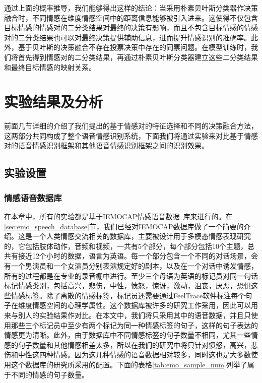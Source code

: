 通过上面的概率推导，我们能够得出这样的结论：当采用朴素贝叶斯分类器作决策融合时，不同情感在维度情感空间中的距离信息能够被引入进来。这使得不仅包含目标情感的情感对的二分类结果对最终的决策有影响，而且不包含目标情感的情感对的二分类结果也可以对最终决策提供辅助信息，进而提升情感识别的准确率。此外，基于贝叶斯的决策融合不存在投票决策中存在的同票问题。在模型训练时，我们将首先得到情感对的二分类结果，再通过朴素贝叶斯分类器建立这些二分类结果和最终目标情感的映射关系。

\section{实验结果及分析}
\label{sec:experiment}

前面几节详细的介绍了我们提出的基于情感对的特征选择和不同的决策融合方法，这两部分共同构成了整个语音情感识别系统，下面我们将通过实验来对比基于情感对的语音情感识别框架和其他语音情感识别框架之间的识别效果。

\subsection{实验设置}
\label{ssec:experiment_setup}

\subsubsection{情感语音数据库}
\label{sssec:speech_database}

在本章中，所有的实验都是基于IEMOCAP情感语音数据~\cite{Busso2008IEMOCAP}库来进行的。在\ref{sec:emo_speech_database}节，我们已经对IEMOCAP数据库做了一个简要的介绍。这是一个人类情感交流相关的数据库，主要被设计用于多模态情感表现研究的，它包括肢体动作，音频和视频，一共有5个部分，每个部分包括10个主题，总共有接近12个小时的数据，语言为英语。每一个部分包含一个不同的对话场景，会有一个男演员和一个女演员分别表演规定好的剧本，以及在一个对话中诱发情感，所有的过程都是在专业的录音棚中进行。至少三个母语为英语的标记员对同一句话标记情感类别，包括高兴，悲伤，中性，愤怒，惊讶，激动，沮丧，厌恶，恐惧这些情感标签。除了离散的情感标签，标记员还需要通过FeelTrace软件标注每个句子在维度情感空间的心理学属性。这个数据库被许多的研究工作采用，因此可以用来与别人的实验结果作对比。在本文中，我们将只采用其中的语音数据，并且只使用那些三个标记员中至少有两个标记为同一种情感标签的句子，这样的句子表达的情感更为清晰。此外，由于数据库中不同情感标签的句子数量不相同，尤其一些情感的句子数量和其他情感相差太多，所以在我们的研究中将只针对愤怒，高兴，悲伤和中性这四种情感。因为这几种情感的语音数据相对较多，同时这也是大多数使用这个数据库的研究所采用的配置。下面的表格\ref{tab:emo_sample_num}列举了属于不同的情感的句子数量。

